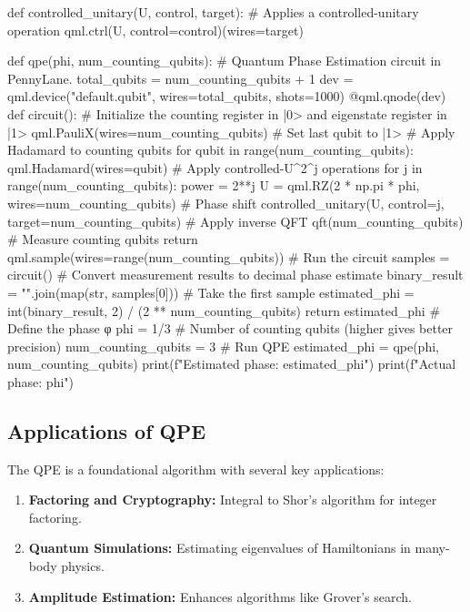 \documentclass[%
oneside,                 %
final,                   %
10pt]{article}
\begin{document}
def controlled_unitary(U, control, target):
   # Applies a controlled-unitary operation
   qml.ctrl(U, control=control)(wires=target)


def qpe(phi, num_counting_qubits):
   # Quantum Phase Estimation circuit in PennyLane.
   total_qubits = num_counting_qubits + 1
   dev = qml.device("default.qubit", wires=total_qubits, shots=1000)
   @qml.qnode(dev)
   def circuit():
       # Initialize the counting register in |0> and eigenstate register in |1>
       qml.PauliX(wires=num_counting_qubits)  # Set last qubit to |1>
       # Apply Hadamard to counting qubits
       for qubit in range(num_counting_qubits):
           qml.Hadamard(wires=qubit)
       # Apply controlled-U^2^j operations
       for j in range(num_counting_qubits):
           power = 2**j
           U = qml.RZ(2 * np.pi * phi, wires=num_counting_qubits)  # Phase shift
           controlled_unitary(U, control=j, target=num_counting_qubits)
       # Apply inverse QFT
       qft(num_counting_qubits)
       # Measure counting qubits
       return qml.sample(wires=range(num_counting_qubits))
   # Run the circuit
   samples = circuit()
   # Convert measurement results to decimal phase estimate
   binary_result = "".join(map(str, samples[0]))  # Take the first sample
   estimated_phi = int(binary_result, 2) / (2 ** num_counting_qubits)
   return estimated_phi
# Define the phase φ
phi = 1/3
# Number of counting qubits (higher gives better precision)
num_counting_qubits = 3
# Run QPE
estimated_phi = qpe(phi, num_counting_qubits)
print(f"Estimated phase: {estimated_phi}")
print(f"Actual phase: {phi}")

\epycode


\subsection{Applications of QPE}

The QPE is a foundational algorithm with several key applications:
\begin{enumerate}
\item \textbf{Factoring and Cryptography:} Integral to Shor's algorithm for integer factoring.

\item \textbf{Quantum Simulations:} Estimating eigenvalues of Hamiltonians in many-body physics.

\item \textbf{Amplitude Estimation:} Enhances algorithms like Grover's search.
\end{enumerate}
\end{document}
